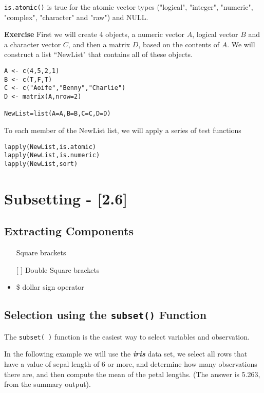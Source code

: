 \texttt{is.atomic()} is true for the atomic vector 
types ("logical", "integer", "numeric", "complex", "character" and "raw") and NULL.

\noindent\textbf{Exercise} First we will create 4 objects, a numeric vector $A$, 
logical vector $B$ and a character vector $C$, and then a matrix $D$, based on 
the contents of $A$. We will construct a list ``NewList" that contains all of these objects.

\begin{framed}
\begin{verbatim}
A <- c(4,5,2,1)
B <- c(T,F,T)
C <- c("Aoife","Benny","Charlie")
D <- matrix(A,nrow=2)

NewList=list(A=A,B=B,C=C,D=D)
\end{verbatim}
\end{framed}
To each member of the NewList list, we will apply a series of test functions
\begin{framed}
\begin{verbatim}
lapply(NewList,is.atomic)
lapply(NewList,is.numeric)
lapply(NewList,sort)
\end{verbatim}
\end{framed}
\newpage
\section*{Subsetting - [2.6]}
\subsection*{Extracting Components}

\begin{itemize}
\item []  Square brackets
\item [[ ]]  Double Square brackets
\item \$  dollar sign operator
\end{itemize}


\subsection*{Selection using the \texttt{subset()} Function}
The \texttt{subset( )} function is the easiest way to select variables and observation. 

In the following example we will use the \textit{\textbf{iris}} data set, we select all rows that have a value of sepal length of 6 or more, and determine how many observations there are, and then compute the mean of the petal lengths. (The answer is 5.263, from the summary output).

